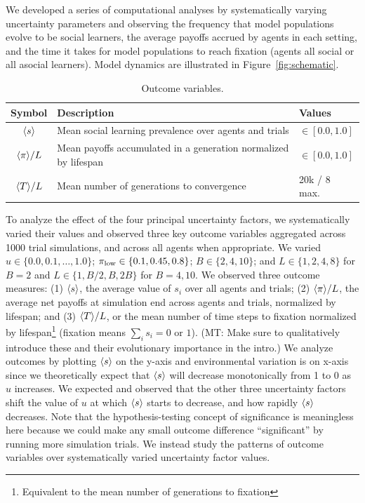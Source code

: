 \documentclass[letterpaper,11.5pt]{scrartcl}
\newcommand{\mt}[1]{{\textcolor{myorange} {({\tiny MT:} #1)}}}
\begin{document}
We developed a series of computational
analyses by systematically varying uncertainty parameters and observing the
frequency that model populations evolve to be social learners, the average payoffs
accrued by agents in each setting, and the time it takes for model populations to
reach fixation (agents all social or all asocial learners). Model dynamics are
illustrated in Figure~\ref{fig:schematic}. 

\begin{table}[h]
    \caption{Outcome variables.}
    \label{tab:outcomeVariables}
    \centering %
    \begin{tabular}{cp{4.25in}p{0.85in}} \toprule

        Symbol & Description & Values \\ 

        \midrule  

        $\langle s \rangle$ & Mean social learning prevalence over agents and trials
                  & $\in [0.0, 1.0]$ \\

        $\langle \pi \rangle / L$ & Mean payoffs accumulated in a generation normalized by
        lifespan & $\in [0.0, 1.0]$ \\

        $\langle T \rangle / L$ & Mean number of generations to convergence & 20k / 8 max. \\
        \bottomrule
    \end{tabular}
\end{table}

To analyze the effect of the four principal uncertainty factors, we systematically
varied their values and observed three key outcome variables aggregated across 1000
trial simulations, and across all agents when appropriate. We varied $u \in \{0.0,
0.1, \ldots, 1.0\}$; $\pi_{\mathrm{low}} \in \{0.1, 0.45, 0.8\}$; $B \in \{2, 4, 10\}$; and $L
\in \{1,2,4,8\}$ for $B=2$ and $L \in \{1,B/2,B,2B\}$ for $B=4,10$.  We observed
three outcome measures: (1) $\langle s \rangle$, the average value of $s_i$ over all agents
and trials; (2) $\langle \pi \rangle / L$, the average net payoffs at simulation end across
agents and trials, normalized by lifespan; and (3) $\langle T \rangle / L$, 
or the mean number of time steps to fixation normalized by
lifespan\footnote{Equivalent to the mean number of generations to fixation}
(fixation means $\sum_i s_i = 0 \text{ or } 1$). \mt{Make sure to qualitatively
introduce these and their evolutionary importance in the intro.}
We analyze outcomes by plotting $\langle s \rangle$ on the y-axis and environmental
variation is on x-axis since we theoretically expect that $\langle s \rangle$ will 
decrease monotonically from 1 to 0 as $u$ increases. We expected and observed
that the other three uncertainty factors shift the value of $u$ at which 
$\langle s \rangle$ starts to decrease, and how rapidly $\langle s \rangle$ decreases. Note that the
hypothesis-testing concept of significance is meaningless here because we could
make any small outcome difference ``significant'' by running more simulation trials.
We instead study the patterns of outcome 
variables over systematically varied uncertainty factor values. 
\end{document}
